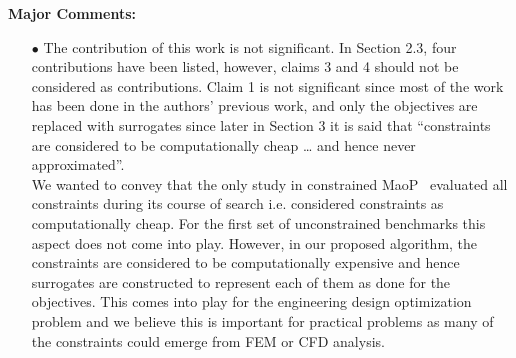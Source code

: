 \documentclass[onecolumn,10pt]{asme2ej}
\begin{document}
\textbf{Major Comments:}
\begin{itemize}
\item[$\bullet$]	The contribution of this work is not significant. In Section 2.3, four contributions have been listed, however, claims 3 and 4 should not be considered as contributions. Claim 1 is not significant since most of the work has been done in the authors’ previous work, and only the objectives are replaced with surrogates since later in Section 3 it is said that “constraints are considered to be computationally cheap … and hence never approximated”.\\

{\color{blue}
We wanted to convey that the only study in constrained MaoP~\cite{KHTchugh2016const} evaluated all constraints during its course of search i.e. considered constraints as computationally cheap. For the first set of unconstrained benchmarks this aspect does not come into play. However, in our proposed algorithm, the constraints are considered to be computationally expensive and hence surrogates are constructed to represent each of them as done for the objectives. This comes into play for the engineering design optimization problem and we believe this is important for practical problems as many of the constraints could emerge from FEM or CFD analysis. \\

}
\end{itemize}
\end{document}
